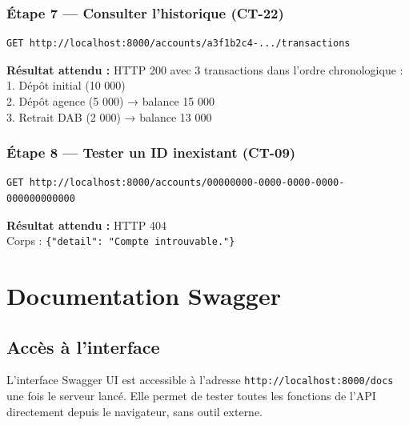 \documentclass[12pt,a4paper]{article}
\begin{document}
\subsubsection{Étape 7 — Consulter l'historique (CT-22)}

\begin{lstlisting}[style=bash, caption={Appel GET /accounts/\{id\}/transactions}]
GET http://localhost:8000/accounts/a3f1b2c4-.../transactions
\end{lstlisting}

\begin{successbox}
\textbf{Résultat attendu :} HTTP 200 avec 3 transactions dans l'ordre chronologique :\\
1. Dépôt initial (10 000)\\
2. Dépôt agence (5 000) → balance 15 000\\
3. Retrait DAB (2 000) → balance 13 000
\end{successbox}

\subsubsection{Étape 8 — Tester un ID inexistant (CT-09)}

\begin{lstlisting}[style=bash, caption={Test CT-09 : compte inexistant}]
GET http://localhost:8000/accounts/00000000-0000-0000-0000-000000000000
\end{lstlisting}

\begin{dangerbox}
\textbf{Résultat attendu :} HTTP 404\\
Corps : \texttt{\{"detail": "Compte introuvable."\}}
\end{dangerbox}

\section{Documentation Swagger}

\subsection{Accès à l'interface}

L'interface Swagger UI est accessible à l'adresse \texttt{http://localhost:8000/docs} une fois le serveur lancé. Elle permet de tester toutes les fonctions de l'API directement depuis le navigateur, sans outil externe.
\end{document}
